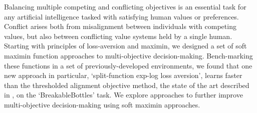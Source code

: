 
Balancing multiple competing and conflicting objectives is an essential task for any artificial intelligence tasked with satisfying human values or preferences. Conflict arises both from misalignment between individuals with competing values, but also between conflicting value systems held by a single human. Starting with principles of loss-aversion and maximin, we designed a set of soft maximin function approaches to multi-objective decision-making. Bench-marking these functions in a set of previously-developed environments, we found that one new approach in particular, `split-function exp-log loss aversion', learns faster than the thresholded alignment objective method, the state of the art described in \cite{vamplew_potential-based_2021}, on the `BreakableBottles' task. We explore approaches to further improve multi-objective decision-making using soft maximin approaches.


